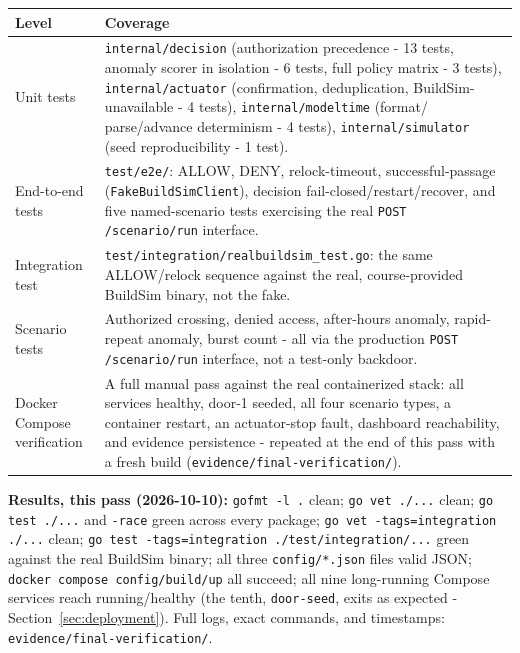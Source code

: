 \documentclass[11pt]{article}
\begin{document}
\begin{longtable}[]{@{}
  >{\raggedright\arraybackslash}p{}
  >{\raggedright\arraybackslash}p{}@{}}
\toprule
\textbf{Level} & \textbf{Coverage} \\
\midrule
\endhead
Unit tests & \texttt{internal/decision} (authorization precedence -
13 tests, anomaly scorer in isolation - 6 tests, full policy matrix -
3 tests), \texttt{internal/actuator} (confirmation, deduplication,
BuildSim-unavailable - 4 tests), \texttt{internal/modeltime} (format/
parse/advance determinism - 4 tests), \texttt{internal/simulator}
(seed reproducibility - 1 test). \\
End-to-end tests & \texttt{test/e2e/}: ALLOW, DENY, relock-timeout,
successful-passage (\texttt{FakeBuildSimClient}), decision
fail-closed/restart/recover, and five named-scenario tests exercising
the real \texttt{POST /scenario/run} interface. \\
Integration test & \texttt{test/integration/realbuildsim\_test.go}: the
same ALLOW/relock sequence against the real, course-provided BuildSim
binary, not the fake. \\
Scenario tests & Authorized crossing, denied access, after-hours
anomaly, rapid-repeat anomaly, burst count - all via the production
\texttt{POST /scenario/run} interface, not a test-only backdoor. \\
Docker Compose verification & A full manual pass against the real
containerized stack: all services healthy, door-1 seeded, all four
scenario types, a container restart, an actuator-stop fault, dashboard
reachability, and evidence persistence - repeated at the end of this
pass with a fresh build (\texttt{evidence/final-verification/}). \\
\bottomrule
\end{longtable}

\textbf{Results, this pass (2026-10-10):} \texttt{gofmt -l .} clean;
\texttt{go vet ./...} clean; \texttt{go test ./...} and \texttt{-race}
green across every package; \texttt{go vet -tags=integration ./...} clean;
\texttt{go test -tags=integration ./test/integration/...} green against
the real BuildSim binary; all three \texttt{config/*.json} files valid
JSON; \texttt{docker compose config/build/up} all succeed; all nine
long-running Compose services reach running/healthy (the tenth,
\texttt{door-seed}, exits as expected - Section~\ref{sec:deployment}).
Full logs, exact commands, and timestamps:
\texttt{evidence/final-verification/}.
\end{document}
